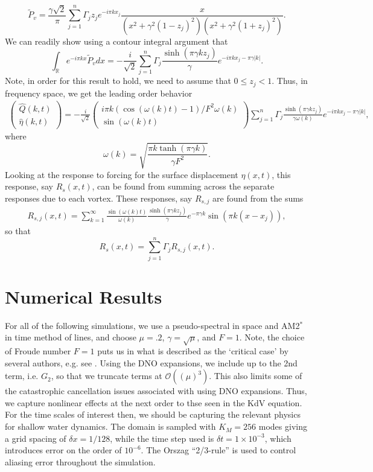 \documentclass[a4paper,11pt]{article}
\newcommand{\bp}{\begin{pmatrix}}
\newcommand{\ep}{\end{pmatrix}}
\begin{document}
\[
\tilde{P}_{v} = \frac{\gamma\sqrt{2}}{\pi}\sum_{j=1}^{n}\Gamma_{j}z_{j}e^{-i\pi kx_{j}} \frac{x}{(x^{2}+\gamma^{2}(1-z_{j})^{2})(x^{2}+\gamma^{2}(1+z_{j})^{2})} .
\]
We can readily show using a contour integral argument that 
\[
\int_{\mathbb{R}}e^{-i\pi kx} \tilde{P}_{v}dx = -\frac{i}{\sqrt{2}}\sum_{j=1}^{n}\Gamma_{j} \frac{\sinh(\pi \gamma k z_{j})}{\gamma} e^{-i\pi kx_{j}-\pi \gamma |k|}. 
\]
Note, in order for this result to hold, we need to assume that $0\leq z_{j} <1$.  Thus, in frequency space, we get the leading order behavior
\begin{align*}
\bp \hat{Q}(k,t) \\ \hat{\eta}(k,t) \ep = -\frac{i}{\sqrt{2}}\bp i\pi k(\cos(\omega(k)t)-1)/F^{2}\omega(k) \\   \sin(\omega(k)t) \ep \sum_{j=1}^{n}\Gamma_{j}\frac{\sinh(\pi \gamma k z_{j})}{\gamma \omega(k)}e^{-i\pi kx_{j}-\pi \gamma |k|},
\end{align*}
where 
\[
\omega(k) = \sqrt{\frac{ \pi k \tanh(\pi \gamma k)}{ \gamma F^{2}}}.  
\]
Looking at the response to forcing for the surface displacement $\eta(x,t)$, this response, say $R_{s}(x,t)$, can be found from summing across the separate responses due to each vortex.  These responses, say $R_{s,j}$ are found from the sums
\begin{align*}
R_{s,j}(x,t) = \sum_{k=1}^{\infty} \frac{\sin(\omega(k)t)}{\omega(k)}\frac{\sinh(\pi \gamma k z_{j})}{\gamma}e^{-\pi \gamma k}\sin(\pi k (x-x_{j})),
\end{align*}
so that 
\[
R_{s}(x,t) = \sum_{j=1}^{n}\Gamma_{j}R_{s,j}(x,t).
\]
\section*{Numerical Results}
For all of the following simulations, we use a pseudo-spectral in space and AM2$^{\ast}$ \cite{fornberg} in time method of lines, and choose $\mu=.2$, $\gamma = \sqrt{\mu}$, and $F=1$.  Note, the choice of Froude number $F=1$ puts us in what is described as the `critical case' by several authors, e.g. see \cite{tryggvason}.  Using the DNO expansions, we include up to the 2nd term, i.e. $G_{2}$, so that we truncate terms at $\mathcal{O}((\mu)^{3})$.  This also limits some of the catastrophic cancellation issues associated with using DNO expansions.  Thus, we capture nonlinear effects at the next order to thse seen in  the KdV equation.  For the time scales of interest then, we should be capturing the relevant physics for shallow water dynamics.  The domain is sampled with $K_{M} = 256$ modes giving a grid spacing of $\delta x = 1/128$, while the time step used is $\delta t = 1\times 10^{-3}$, which introduces error on the order of $10^{-6}$.  The Orszag ``2/3-rule'' is used to control aliasing error throughout the simulation.     
\end{document}
